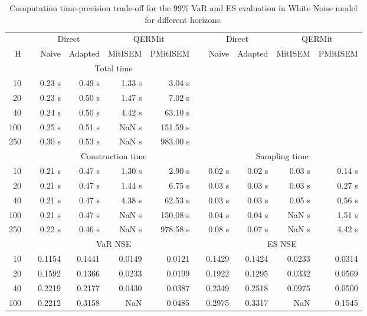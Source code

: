 \footnotesize{  
{ \renewcommand{\arraystretch}{1.3} 
\begin{longtable}{rr rrrr r rrrr}  
\caption{Computation time-precision trade-off for the  $99\%$ VaR and ES evaluation in White Noise model for different horizons.} 
\label{tab:time_precision_WN} \\ 
 & & \multicolumn{2}{c}{Direct} & \multicolumn{2}{c}{QERMit}&  & \multicolumn{2}{c}{Direct} & \multicolumn{2}{c}{QERMit} \\ \cline{3-6} \cline{8-11} 
 H & & Naive & Adapted & MitISEM & PMitISEM & & Naive & Adapted & MitISEM & PMitISEM \\ \hline 
 & & \multicolumn{4}{c}{Total time}  \\ \cline{3-6} 
10 & & 0.23 s & 0.49 s & 1.33 s & 3.04 s \\ 
20 & & 0.23 s & 0.50 s & 1.47 s & 7.02 s \\ 
40 & & 0.24 s & 0.50 s & 4.42 s & 63.10 s \\ 
100 & & 0.25 s & 0.51 s &  NaN s & 151.59 s \\ 
250 & & 0.30 s & 0.53 s &  NaN s & 983.00 s \\ 
\hline 
 & & \multicolumn{4}{c}{Construction time} & & \multicolumn{4}{c}{ Sampling time} \\ \cline{3-6}  \cline{8-11}
10 & & 0.21 s & 0.47 s & 1.30 s & 2.90 s && 0.02 s & 0.02 s & 0.03 s & 0.14 s \\ 
20 & & 0.21 s & 0.47 s & 1.44 s & 6.75 s && 0.03 s & 0.03 s & 0.03 s & 0.27 s \\ 
40 & & 0.21 s & 0.47 s & 4.38 s & 62.53 s && 0.03 s & 0.03 s & 0.05 s & 0.56 s \\ 
100 & & 0.21 s & 0.47 s &  NaN s & 150.08 s && 0.04 s & 0.04 s &  NaN s & 1.51 s \\ 
250 & & 0.22 s & 0.46 s &  NaN s & 978.58 s && 0.08 s & 0.07 s &  NaN s & 4.42 s \\ 
\hline 
 & & \multicolumn{4}{c}{VaR NSE} &&  \multicolumn{4}{c}{ES NSE} \\ \cline{3-6}  \cline{8-11}
10 && 0.1154  & 0.1441  & 0.0149 & 0.0121 && 0.1429  & 0.1424  & 0.0233 & 0.0314 \\ 
20 && 0.1592  & 0.1366  & 0.0233 & 0.0199 && 0.1922  & 0.1295  & 0.0332 & 0.0569 \\ 
40 && 0.2219  & 0.2177  & 0.0430 & 0.0387 && 0.2349  & 0.2518  & 0.0975 & 0.0500 \\ 
100 && 0.2212  & 0.3158  &    NaN & 0.0485 && 0.2975  & 0.3317  &    NaN & 0.1545 \\ 

\end{longtable}}}
